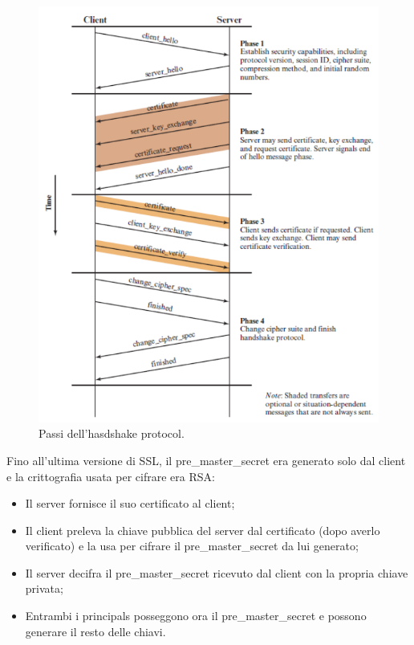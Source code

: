  \begin{figure}
    \centering
    \includegraphics[width=1\textwidth]{images/chapter5/5-2.png}
    \caption{Passi dell'hasdshake protocol.}
    \label{fig:5-2}
\end{figure}

Fino all'ultima versione di SSL, il pre\_master\_secret era generato solo dal client e la crittografia usata per cifrare era RSA: 
\begin{itemize}
    \item Il server fornisce il suo certificato al client;
	\item Il client preleva la chiave pubblica del server dal certificato (dopo averlo verificato) e la usa per cifrare il pre\_master\_secret da lui generato; 
	\item Il server decifra il pre\_master\_secret ricevuto dal client  con la propria chiave privata;
	\item Entrambi i principals posseggono ora il pre\_master\_secret e possono generare il resto delle chiavi.
\end{itemize}
	
